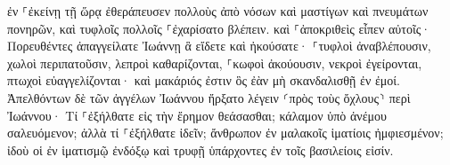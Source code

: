 \documentclass{openreader}
\begin{document}
ἐν ⸀ἐκείνῃ τῇ ὥρᾳ ἐθεράπευσεν πολλοὺς ἀπὸ νόσων καὶ μαστίγων καὶ πνευμάτων πονηρῶν, καὶ τυφλοῖς πολλοῖς ⸀ἐχαρίσατο βλέπειν. 
καὶ ⸀ἀποκριθεὶς εἶπεν αὐτοῖς· Πορευθέντες ἀπαγγείλατε Ἰωάννῃ ἃ εἴδετε καὶ ἠκούσατε· ⸀τυφλοὶ ἀναβλέπουσιν, χωλοὶ περιπατοῦσιν, λεπροὶ καθαρίζονται, ⸀κωφοὶ ἀκούουσιν, νεκροὶ ἐγείρονται, πτωχοὶ εὐαγγελίζονται· 
καὶ μακάριός ἐστιν ὃς ἐὰν μὴ σκανδαλισθῇ ἐν ἐμοί. 
Ἀπελθόντων δὲ τῶν ἀγγέλων Ἰωάννου ἤρξατο λέγειν ⸂πρὸς τοὺς ὄχλους⸃ περὶ Ἰωάννου· Τί ⸀ἐξήλθατε εἰς τὴν ἔρημον θεάσασθαι; κάλαμον ὑπὸ ἀνέμου σαλευόμενον; 
ἀλλὰ τί ⸀ἐξήλθατε ἰδεῖν; ἄνθρωπον ἐν μαλακοῖς ἱματίοις ἠμφιεσμένον; ἰδοὺ οἱ ἐν ἱματισμῷ ἐνδόξῳ καὶ τρυφῇ ὑπάρχοντες ἐν τοῖς βασιλείοις εἰσίν. 
\end{document}
